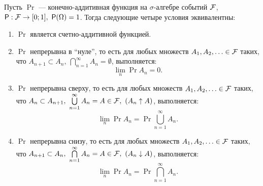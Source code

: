 \begin{theorem}
	Пусть $ \Pr $ --- конечно-аддитивная функция на $ \sigma $-алгебре событий $ \mathcal{F} $, \(\Pr: \F \to [0; 1],\ \Pr(\Omega) = 1 \). Тогда следующие четыре условия эквивалентны:
	\begin{enumerate}[label = (\alph*)]
		\item $ \Pr $ является счетно-аддитивной функцией.
		
		\item $ \Pr $ непрерывна в ``нуле'', то есть для любых множеств \(A_1, A_2, \ldots \in \mathcal{F} \) таких, что \(A_{n + 1} \subset A_n,\ \bigcap\limits_{n = 1}^{\infty}A_n = \emptyset \), выполняется:
		\[
		\lim\limits_{n}\Pr{A_n} = 0.
		\]  
		
		\item $ \Pr $ непрерывна сверху, то есть для любых множеств \(A_1, A_2, \ldots \in \mathcal{F} \) таких, что \(A_{n} \subset A_{n + 1},\ \bigcup\limits_{n = 1}^{\infty}A_n = A \in \mathcal{F},\  (A_n \uparrow A) \), выполняется:
		\[
		\lim\limits_{n}\Pr{A_n} = \Pr{\bigcup\limits_{n = 1}^{\infty}A_n}.
		\]  
		
		\item $ \Pr $ непрерывна снизу, то есть для любых множеств \(A_1, A_2, \ldots \in \mathcal{F} \) таких, что \(A_{n + 1} \subset A_{n},\ \bigcap\limits_{n = 1}^{\infty}A_n = A \in \mathcal{F},\  (A_n \downarrow A) \), выполняется:
		\[
		\lim\limits_{n}\Pr{A_n} = \Pr{\bigcap\limits_{n = 1}^{\infty}A_n}.
		\]  
		
	\end{enumerate}
\end{theorem}
